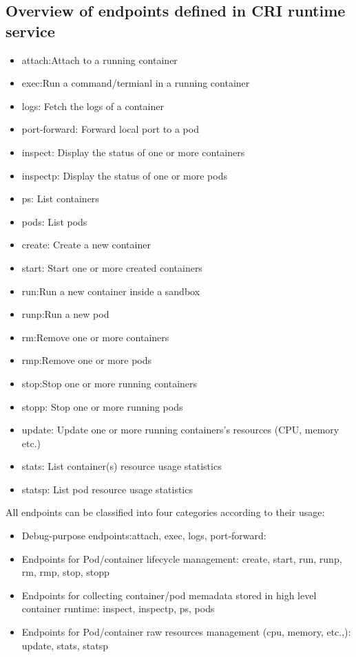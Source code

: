 \subsection{Overview of endpoints defined in CRI runtime service}
\begin{itemize}
    \item  attach:Attach to a running container
    \item  exec:Run a command/termianl in a running container
    \item  logs: Fetch the logs of a container
    \item  port-forward: Forward local port to a pod

    \item  inspect: Display the status of one or more containers
    \item  inspectp: Display the status of one or more pods
    \item  ps:  List containers
    \item  pods: List pods
    
    \item  create: Create a new container
    \item  start: Start one or more created containers
    \item  run:Run a new container inside a sandbox
    \item  runp:Run a new pod
    \item  rm:Remove one or more containers
    \item  rmp:Remove one or more pods
    \item  stop:Stop one or more running containers
    \item  stopp: Stop one or more running pods

    \item  update: Update one or more running containers's resources (CPU, memory etc.)
    \item  stats: List container(s) resource usage statistics
    \item  statsp: List pod resource usage statistics
\end{itemize}

All endpoints can be classified into four categories according to their usage:
\begin{itemize}
    \item  Debug-purpose endpoints:attach, exec, logs, port-forward:
    \item  Endpoints for Pod/container lifecycle management: create, start, run, runp, rm, rmp, stop, stopp
    \item  Endpoints for collecting container/pod memadata stored in high level container runtime: inspect, inspectp, ps, pods
    \item  Endpoints for Pod/container raw resources management (cpu, memory, etc.,): update, stats, statsp
\end{itemize}

